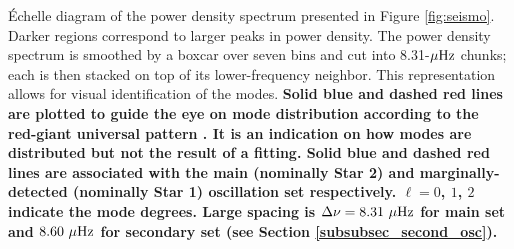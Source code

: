 \label{fig:echelle} \'Echelle diagram of the power density spectrum presented in Figure \ref{fig:seismo}. Darker regions correspond to larger peaks in power density. The power density spectrum is smoothed by a boxcar over seven bins and cut into 8.31-$\mu\rm{Hz}$ chunks; each is then stacked on top of its lower-frequency neighbor. This representation allows for visual identification of the modes. \textbf{Solid blue and dashed red lines are plotted to guide the eye on mode distribution according to the red-giant universal pattern \citep{mos11}. It is an indication on how modes are distributed but not the result of a fitting. Solid blue and dashed red lines are associated with the main (nominally Star 2) and marginally-detected (nominally Star 1) oscillation set respectively. $\ell = 0$, $1$, $2$ indicate the mode degrees. Large spacing is $\Delta\nu = 8.31\ \mu\rm{Hz}$ for main set and $8.60\ \mu\rm{Hz}$ for secondary set (see Section \ref{subsubsec_second_osc}).}

  